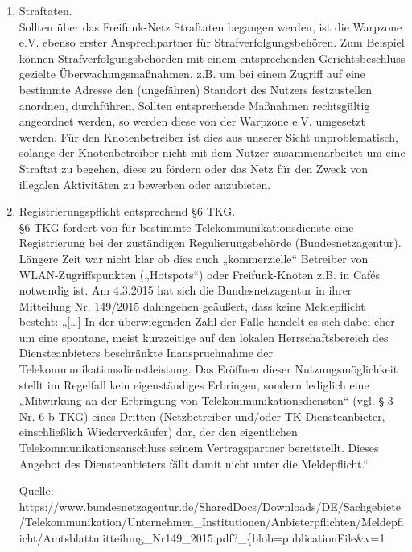 \documentclass{article}
\begin{document}
\begin{enumerate}
\item Straftaten.\\ Sollten über das Freifunk-Netz Straftaten begangen werden, ist die Warpzone e.V. ebenso erster Ansprechpartner für Strafverfolgungsbehören. Zum Beispiel können Strafverfolgungsbehörden mit einem entsprechenden Gerichtsbeschluss gezielte Überwachungsmaßnahmen, z.B. um bei einem Zugriff auf eine bestimmte Adresse den (ungefähren) Standort des Nutzers festzustellen anordnen, durchführen. Sollten entsprechende Maßnahmen rechtsgültig angeordnet  werden, so werden diese von der Warpzone e.V. umgesetzt werden. Für den Knotenbetreiber ist dies aus unserer Sicht unproblematisch, solange der Knotenbetreiber nicht mit dem Nutzer zusammenarbeitet um eine Straftat zu begehen, diese zu fördern oder das Netz für den Zweck von illegalen Aktivitäten zu bewerben oder anzubieten.

\item Registrierungspflicht entsprechend §6 TKG.\\ §6 TKG fordert von für bestimmte Telekommunikationsdienste eine Registrierung bei der zuständigen Regulierungsbehörde (Bundesnetzagentur). Längere Zeit war nicht klar ob dies auch „kommerzielle“ Betreiber von WLAN-Zugriffspunkten („Hotspots“) oder Freifunk-Knoten z.B. in Cafés notwendig ist. Am 4.3.2015 hat sich die Bundesnetzagentur in ihrer Mitteilung Nr. 149/2015 dahingehen geäußert, dass keine Meldepflicht besteht: „[…] In der überwiegenden Zahl der Fälle handelt es sich dabei eher um eine spontane, meist kurzzeitige auf den lokalen Herrschaftsbereich des Diensteanbieters beschränkte Inanspruchnahme der Telekommunikationsdienstleistung. Das Eröffnen dieser Nutzungsmöglichkeit stellt im Regelfall kein eigenständiges Erbringen, sondern lediglich eine „Mitwirkung an der Erbringung von Telekommunikationsdiensten“ (vgl. § 3 Nr. 6 b TKG) eines Dritten (Netzbetreiber und/oder TK-Diensteanbieter, einschließlich Wiederverkäufer) dar, der den eigentlichen Telekommunikationsanschluss seinem Vertragspartner bereitstellt. Dieses Angebot des  Diensteanbieters fällt damit nicht unter die Meldepflicht.“

Quelle: https://www.bundesnetzagentur.de/SharedDocs/Downloads/DE/Sachgebiete/Telekommunikation/\linebreak Unternehmen\_Institutionen/Anbieterpflichten/Meldepflicht/Amtsblattmitteilung\_Nr149\_2015.pdf?\_\{blob\linebreak =publicationFile\&v=1



\end{enumerate}
\end{document}
